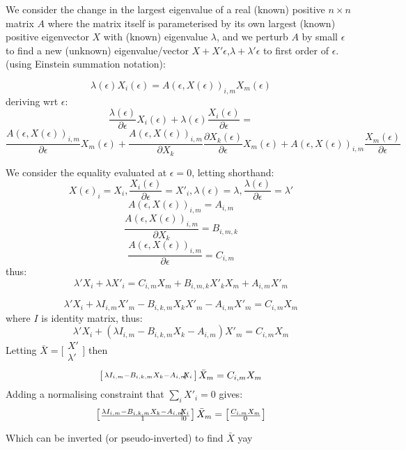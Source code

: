 \documentclass{article}
\newcommand{\rvline}{\hspace*{-\arraycolsep}\vline\hspace*{-\arraycolsep}}
\begin{document}

We consider the change in the largest eigenvalue of a real (known) positive $n\times n$ matrix $A$ where the matrix itself is parameterised by its own largest (known) positive eigenvector $X$ with (known) eigenvalue $\lambda$, and we perturb $A$ by small $\epsilon$ to find a new (unknown) eigenvalue/vector $X+X'\epsilon$,$\lambda+\lambda'\epsilon$ to first order of $\epsilon$. (using Einstein summation notation):

$$ \lambda(\epsilon)X_{i}(\epsilon) = A(\epsilon,X(\epsilon))_{i,m}X_{m}(\epsilon) $$
deriving wrt $\epsilon$:
$$ \frac{\lambda(\epsilon)}{\partial \epsilon}X_{i}(\epsilon) + \lambda(\epsilon)\frac{X_{i}(\epsilon)}{\partial \epsilon} = $$
$$\frac{A(\epsilon,X(\epsilon))_{i,m}}{\partial \epsilon}X_{m}(\epsilon)
 + \frac{A(\epsilon,X(\epsilon))_{i,m}}{\partial X_{k}}\frac{\partial X_{k}(\epsilon)}{\partial \epsilon}X_{m}(\epsilon)
 + A(\epsilon,X(\epsilon))_{i,m}\frac{X_{m}(\epsilon)}{\partial \epsilon} $$

We consider the equality evaluated at $\epsilon=0$, letting shorthand:
$$X(\epsilon)_{i}=X_i, \frac{X_i(\epsilon)}{\partial \epsilon}=X'_i, \lambda(\epsilon)=\lambda, \frac{\lambda(\epsilon)}{\partial \epsilon}=\lambda'$$
$$A(\epsilon,X(\epsilon))_{i,m} = A_{i,m}$$
$$\frac{A(\epsilon,X(\epsilon))_{i,m}}{\partial X_{k}} = B_{i,m,k}$$
$$\frac{A(\epsilon,X(\epsilon))_{i,m}}{\partial \epsilon} = C_{i,m}$$
 thus:\\
$$\lambda'X_i+\lambda X'_i = C_{i,m}X_m + B_{i,m,k}X'_kX_m +A_{i,m}X'_m $$

$$\lambda'X_i+\lambda I_{i,m}X'_m - B_{i,k,m}X_kX'_m - A_{i,m}X'_m = C_{i,m}X_m $$
where $I$ is identity matrix, thus:
$$\lambda'X_i+\left(\lambda I_{i,m} - B_{i,k,m}X_k - A_{i,m}\right)X'_m = C_{i,m}X_m $$
Letting $\bar{X} = \bigl[ \begin{smallmatrix}X' \\\hline \lambda' \end{smallmatrix}\bigr]$ then
$$\left[\begin{smallmatrix}\lambda I_{i,m} - B_{i,k,m}X_k - A_{i,m} & \rvline & X_i \end{smallmatrix}\right]\bar{X}_m = C_{i,m}X_m $$
Adding a normalising constraint that $\sum_i X'_{i}=0$ gives:
$$\left[\begin{smallmatrix}\lambda I_{i,m} - B_{i,k,m}X_k - A_{i,m} & \rvline & X_i \\\hline 1 & \rvline & 0\end{smallmatrix}\right]\bar{X}_m = \left[\begin{smallmatrix} C_{i,m}X_m \\\hline 0\end{smallmatrix}\right] $$

Which can be inverted (or pseudo-inverted) to find $\bar{X}$ yay
\end{document}
